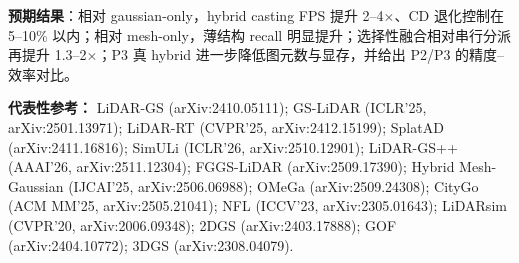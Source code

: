\documentclass[10pt,a4paper]{article}
\begin{document}
\textbf{预期结果}：相对 gaussian-only，hybrid casting FPS 提升 2--4$\times$、CD 退化控制在 5--10\% 以内；相对 mesh-only，薄结构 recall 明显提升；选择性融合相对串行分派再提升 1.3--2$\times$；P3 真 hybrid 进一步降低图元数与显存，并给出 P2/P3 的精度--效率对比。

\vspace{3pt}
\begin{sloppypar}
{\scriptsize
\textbf{代表性参考：}
LiDAR-GS (arXiv:2410.05111); GS-LiDAR (ICLR'25, arXiv:2501.13971); LiDAR-RT (CVPR'25, arXiv:2412.15199);
SplatAD (arXiv:2411.16816); SimULi (ICLR'26, arXiv:2510.12901); LiDAR-GS++ (AAAI'26, arXiv:2511.12304);
FGGS-LiDAR (arXiv:2509.17390); Hybrid Mesh-Gaussian (IJCAI'25, arXiv:2506.06988); OMeGa (arXiv:2509.24308);
CityGo (ACM MM'25, arXiv:2505.21041); NFL (ICCV'23, arXiv:2305.01643); LiDARsim (CVPR'20, arXiv:2006.09348);
2DGS (arXiv:2403.17888); GOF (arXiv:2404.10772); 3DGS (arXiv:2308.04079).
}
\end{sloppypar}
\end{document}
